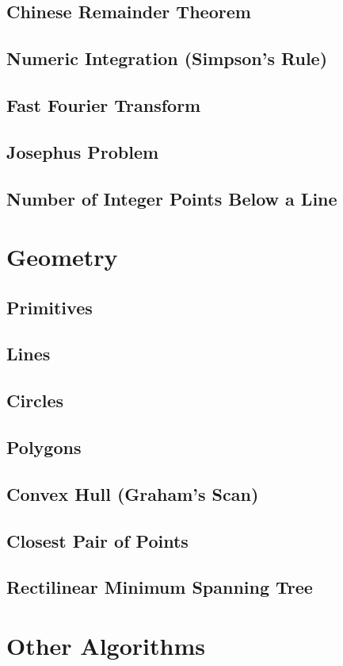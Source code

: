 \documentclass[8pt,a4paper,landscape,oneside]{amsart}
\begin{document}
\begin{multicols*}{3}
	\subsection{Chinese Remainder Theorem}
	\subsection{Numeric Integration (Simpson's Rule)}
	\subsection{Fast Fourier Transform}
	\subsection{Josephus Problem}
	\subsection{Number of Integer Points Below a Line}
\section{Geometry}
	\subsection{Primitives}
	\subsection{Lines}
	\subsection{Circles}
	\subsection{Polygons}
	\subsection{Convex Hull (Graham's Scan)}
	\subsection{Closest Pair of Points}
	\subsection{Rectilinear Minimum Spanning Tree}
\section{Other Algorithms}

\end{multicols*}
\end{document}
